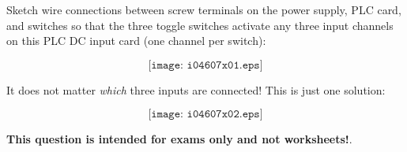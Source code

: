 

Sketch wire connections between screw terminals on the power supply, PLC card, and switches so that the three toggle switches activate any three input channels on this PLC DC input card (one channel per switch):

$$\texttt{[image: i04607x01.eps]}$$







It does not matter {\it which} three inputs are connected!  This is just one solution:

$$\texttt{[image: i04607x02.eps]}$$







{\bf This question is intended for exams only and not worksheets!}.


